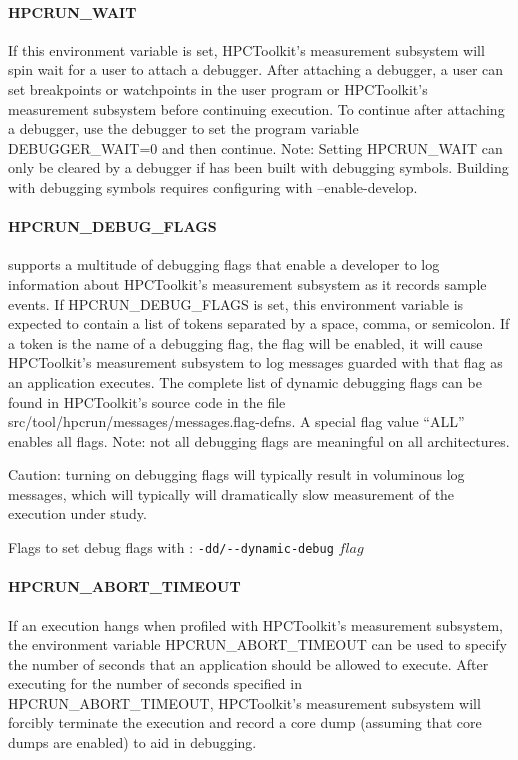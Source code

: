 \paragraph{HPCRUN\_WAIT}

If this environment variable is set, HPCToolkit's measurement subsystem
will spin wait for a user to attach a debugger. After attaching a
debugger, a user can set breakpoints or watchpoints in the user
program or HPCToolkit's measurement subsystem before continuing
execution. To continue after attaching a debugger, use the debugger
to set the program variable DEBUGGER\_WAIT=0 and then continue.
Note: Setting HPCRUN\_WAIT can only be cleared by a debugger
if \HPCToolkit{} has been built with debugging symbols.
Building \HPCToolkit{} with debugging symbols requires
configuring \HPCToolkit{} with --enable-develop.

\paragraph{HPCRUN\_DEBUG\_FLAGS}

\HPCToolkit{} supports a multitude of debugging flags that enable a
developer to log information about HPCToolkit's measurement subsystem
as it records sample events. If HPCRUN\_DEBUG\_FLAGS is set, this
environment variable is expected to contain a list of tokens separated
by a space, comma, or semicolon. If a token is the name of a debugging
flag, the flag will be enabled, it will cause HPCToolkit's measurement
subsystem to log messages guarded with that flag as an application
executes. The complete list of dynamic debugging flags can be found
in HPCToolkit's source code in the file
src/tool/hpcrun/messages/messages.flag-defns. A special flag value ``ALL'' enables all flags. 
\parg
Note: not all debugging flags are
meaningful on all architectures. 

\parg 
Caution: turning on debugging flags
will typically result in voluminous log messages, which will typically will 
dramatically slow measurement of the execution under study.

\parg
Flags to set debug flags with \hpcrun: \verb|-dd/--dynamic-debug| $flag$

\paragraph{HPCRUN\_ABORT\_TIMEOUT}

If an execution hangs when profiled with HPCToolkit's measurement
subsystem, the environment variable HPCRUN\_ABORT\_TIMEOUT can be
used to specify the number of seconds that an application should
be allowed to execute. After executing for the number of seconds
specified in HPCRUN\_ABORT\_TIMEOUT, HPCToolkit's measurement
subsystem will forcibly terminate the execution and record a core
dump (assuming that core dumps are enabled) to aid in debugging.

